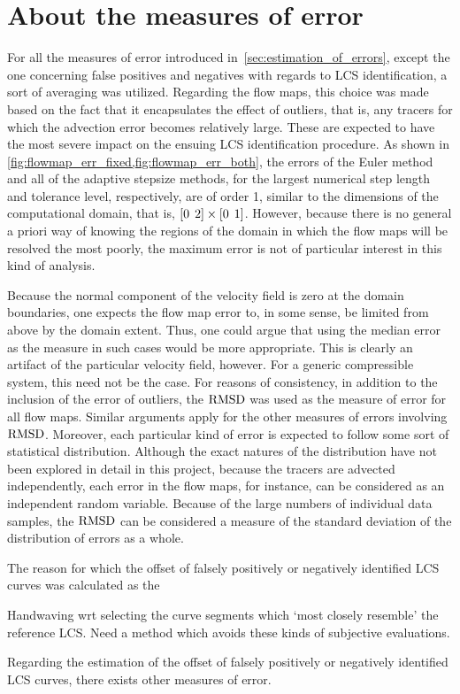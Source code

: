 \section{About the measures of error}
\label{sec:about_the_measures_of_error}

For all the measures of error introduced in~\cref{sec:estimation_of_errors},
except the one concerning false positives and negatives with regards to
LCS identification, a sort of averaging was utilized. Regarding the flow maps,
this choice was made based on the fact that it encapsulates the effect of
outliers, that is, any tracers for which the advection error becomes
relatively large. These are expected to have the most severe impact on the
ensuing LCS identification procedure. As shown in
\cref{fig:flowmap_err_fixed,fig:flowmap_err_both}, the errors of the Euler
method and all of the adaptive stepsize methods, for the largest numerical step
length and tolerance level, respectively, are of order 1, similar to the
dimensions of the computational domain, that is,
$[0\hspace{1ex}2]\times[0\hspace{1ex}1]$. However, because there is no general
a priori way of knowing the regions of the domain in which the flow maps will be
resolved the most poorly, the maximum error is not of particular interest
in this kind of analysis.

Because the normal component of the velocity field is zero at the domain
boundaries, one expects the flow map error to, in some sense, be limited from
above by the domain extent. Thus, one could argue that using the median error
as the measure in such cases would be more appropriate. This is clearly an
artifact of the particular velocity field, however. For a generic compressible
system, this need not be the case. For reasons of consistency, in addition to
the inclusion of the error of outliers, the $\operatorname{RMSD}$ was used as the measure of
error for all flow maps. Similar arguments apply for the other measures
of errors involving $\operatorname{RMSD}$. Moreover, each particular kind of error
is expected to follow some sort of statistical distribution. Although the
exact natures of the distribution have not been explored in detail in this
project, because the tracers are advected independently, each error in
the flow maps, for instance, can be considered as an independent
random variable. Because of the large numbers of individual data samples,
the $\operatorname{RMSD}$ can be considered a measure of the standard deviation of the
distribution of errors as a whole.

The reason for which the offset of falsely positively or negatively identified
LCS curves was calculated as the

\begin{framed}
    Handwaving wrt selecting the curve segments which `most closely resemble'
    the reference LCS. Need a method which avoids these kinds of subjective
    evaluations.
\end{framed}

Regarding the estimation of the offset of falsely positively or negatively
identified LCS curves, there exists other measures of error.
